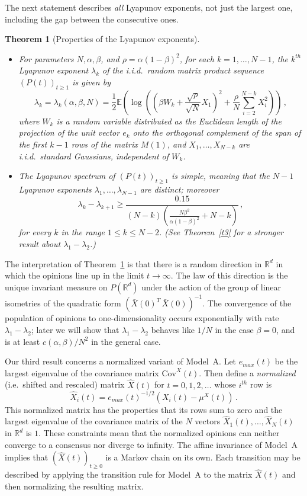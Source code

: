 \documentclass[12pt]{article}
\newtheorem{theorem}{Theorem}
\newcommand{\1}{\mathbf{1}}
\begin{document}
The next statement describes {\it all} Lyapunov exponents, not just the largest one, including the gap between the consecutive ones.
\begin{theorem}[Properties of the Lyapunov exponents]\label{t2} {\quad}
\begin{itemize}
\item[(a)] For parameters $N, \alpha, \beta$, and $\rho = \alpha(1-\beta)^2$, for each $k=1, \dots, N-1$, the $k^{th}$ Lyapunov exponent $\lambda_k$ of the i.i.d.~random matrix product sequence $\left(P(t)\right)_{t \ge 1}$ is given by 
$$ 
\lambda_k=\lambda_k(\alpha,\beta,N)=\frac{1}{2}\mathbb{E}\left(\log\left(\left(\beta W_k + \frac{\sqrt{\rho}}{\sqrt{N}}X_1\right)^2 + \frac{\rho}{N}\sum_{i=2}^{N-k} X_i^2\right)\right)\,,
$$ 
where $W_k$ is a random variable distributed as the Euclidean length of the projection of the unit vector $e_{k}$ onto the orthogonal complement of the span of the first $k-1$ rows of the matrix $M(1)$, and $X_1, \dots, X_{N-k}$ are i.i.d.~standard Gaussians, independent of $W_k$.
\item[(b)]
The Lyapunov spectrum of $\left(P(t)\right)_{t \ge 1}$ is simple, meaning that the $N-1$ Lyapunov exponents $\lambda_1, \dots, \lambda_{N-1}$ are distinct; moreover
$$\lambda_{k}- \lambda_{k+1} \ge \frac{0.15}{(N-k)\left(\frac{N\beta^2}{\alpha(1-\beta)^2} + N-k\right)}\,,$$ for every $k$ in the range $1 \le k \le N-2$. (See Theorem~\ref{t3} for a stronger result about $\lambda_1 - \lambda_2$.)
\end{itemize}
\end{theorem}

{The interpretation of Theorem~\ref{t2} is that there is a random direction in $\mathbb{R}^d$ in which the opinions line up in the limit $t \to \infty$. The law of this direction is the unique invariant measure on $P(\mathbb{R}^d)$ under the action of the group of linear isometries of the quadratic form $\left(\bar{X}(0)^T\,\bar{X}(0)\right)^{-1}$. The convergence of the population of opinions to one-dimensionality occurs exponentially with rate $\lambda_1 - \lambda_2$; later we will show that $\lambda_1 - \lambda_2$ behaves like   $1/N$ in the case $\beta = 0$, and is at least  $c(\alpha, \beta)/N^2$ in the general case.   }



Our third result concerns a normalized variant of Model~A. Let $e_{max}(t)$ be the largest eigenvalue of the covariance matrix $\mathrm{Cov}^X(t)$. Then define a \emph{normalized} (i.e.~shifted and rescaled) matrix $\hat{X}(t)$ for $t = 0,1,2, \dots$ whose $i^{th}$ row is 
$$\hat{X}_i(t) = e_{max}(t)^{-1/2} \left(X_i(t) - \mu^X(t)\right)\,.$$
This normalized matrix has the properties that its rows sum to zero and the largest eigenvalue of the covariance matrix of the $N$ vectors $\hat{X}_1(t), \dots, \hat{X}_N(t)$ in $\mathbb{R}^d$ is $1$. These constraints mean that the normalized opinions can neither converge to a consensus nor diverge to infinity. The affine invariance of Model~A implies that $\left(\hat{X}(t)\right)_{t \ge 0}$ is a Markov chain on its own. Each transition may be described by applying the transition rule for Model~A to the matrix $\hat{X}(t)$ and then normalizing the resulting matrix.
\end{document}
